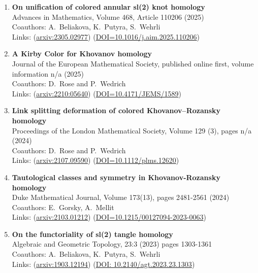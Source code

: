 \documentclass[12pt]{amsart}
\begin{document}
\begin{enumerate}\setlength{\itemsep}{7pt}
\item {\bf On unification of colored annular sl(2) knot homology}\\
Advances in Mathematics, Volume 468, Article 110206 (2025)\\
Coauthors: A.~Beliakova, K.~Putyra, S.~Wehrli\\
Links: (\href{https://arxiv.org/abs/2305.02977}{arxiv:2305.02977}) (\href{https://doi.org/10.1016/j.aim.2025.110206}{DOI=10.1016/j.aim.2025.110206})


\item {\bf A Kirby Color for Khovanov homology}\\
Journal of the European Mathematical Society, published online first, volume information n/a (2025)\\ 
Coauthors: D.~Rose and P.~Wedrich \\
Links: (\href{https://arxiv.org/abs/2210.05640}{arxiv:2210:05640}) (\href{https://doi.org/10.4171/JEMS/1589}{DOI=10.4171/JEMS/1589})

\item {\bf Link splitting deformation of colored Khovanov--Rozansky homology}\\Proceedings of the London Mathematical Society, Volume 129 (3), pages n/a (2024)\\
Coauthors: D.~Rose and P.~Wedrich\\
Links:  (\href{https://arxiv.org/abs/2107.09590}{arxiv:2107.09590}) (\href{https://doi.org/10.1112/plms.12620}{DOI=10.1112/plms.12620})

\item {\bf Tautological classes and symmetry in Khovanov-Rozansky homology}\\
Duke Mathematical Journal, Volume 173(13), pages 2481-2561 (2024)\\
Coauthors: E.~Gorsky, A.~Mellit \\
Links:  (\href{https://arxiv.org/abs/2103.01212}{arxiv:2103.01212}) (\href{https://doi.org/10.1215/00127094-2023-0063}{DOI=10.1215/00127094-2023-0063})

\item {\bf On the functoriality of sl(2) tangle homology}\\
Algebraic and Geometric Topology, 23:3 (2023) pages 1303-1361\\
Coauthors: A.~Beliakova, K.~Putyra, S.~Wehrli\\
Links: (\href{https://arxiv.org/abs/1903.12194}{arxiv:1903.12194}) (\href{https://doi.org/10.2140/agt.2023.23.1303}{DOI: 10.2140/agt.2023.23.1303})



\end{enumerate}
\end{document}
